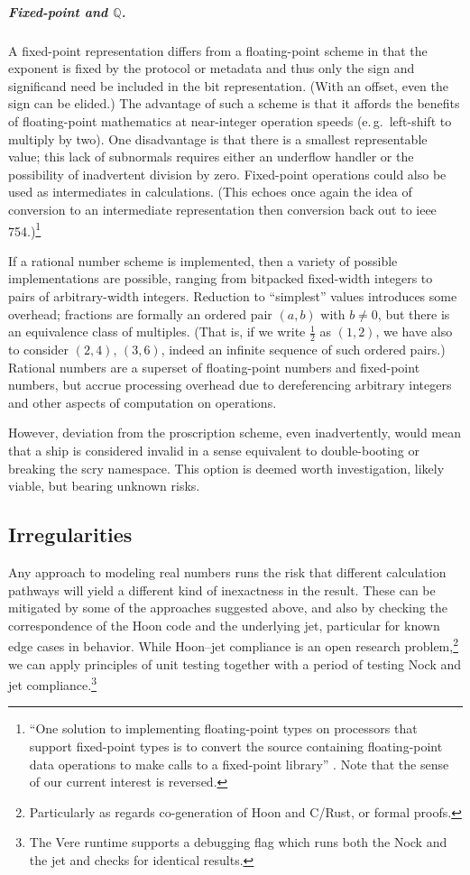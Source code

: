 \documentclass[twoside]{article}
\begin{document}
\subparagraph{Fixed-point and $\mathbb{Q}$.}

A fixed-point representation differs from a floating-point scheme in that the exponent is fixed by the protocol or metadata and thus only the sign and significand need be included in the bit representation.  (With an offset, even the sign can be elided.)  The advantage of such a scheme is that it affords the benefits of floating-point mathematics at near-integer operation speeds (e.\,g.\ left-shift to multiply by two).  One disadvantage is that there is a smallest representable value; this lack of subnormals requires either an underflow handler or the possibility of inadvertent division by zero.  Fixed-point operations could also be used as intermediates in calculations.  (This echoes once again the idea of conversion to an intermediate representation then conversion back out to {\sc ieee} 754.)\footnote{“One solution to implementing floating-point types on processors that support fixed-point types is to
convert the source containing floating-point data operations to make calls to a fixed-point library” \citetext{\citet{Jones2008}, p.~346}.  Note that the sense of our current interest is reversed.}

If a rational number scheme is implemented, then a variety of possible implementations are possible, ranging from bitpacked fixed-width integers to pairs of arbitrary-width integers.  Reduction to “simplest” values introduces some overhead; fractions are formally an ordered pair $(a, b)$ with $b \neq 0$, but there is an equivalence class of multiples.  (That is, if we write $\frac{1}{2}$ as $(1, 2)$, we have also to consider $(2, 4)$, $(3, 6)$, indeed an infinite sequence of such ordered pairs.)  Rational numbers are a superset of floating-point numbers and fixed-point numbers, but accrue processing overhead due to dereferencing arbitrary integers and other aspects of computation on operations.

However, deviation from the proscription scheme, even inadvertently, would mean that a ship is considered invalid in a sense equivalent to double-booting or breaking the scry namespace.  This option is deemed worth investigation, likely viable, but bearing unknown risks.


\subsection{Irregularities}

Any approach to modeling real numbers runs the risk that different calculation pathways will yield a different kind of inexactness in the result.  These can be mitigated by some of the approaches suggested above, and also by checking the correspondence of the Hoon code and the underlying jet, particular for known edge cases in behavior.  While Hoon–jet compliance is an open research problem,\footnote{Particularly as regards co-generation of Hoon and C/Rust, or formal proofs.} we can apply principles of unit testing together with a period of testing Nock and jet compliance.\footnote{The Vere runtime supports a debugging flag which runs both the Nock and the jet and checks for identical results.}
\end{document}
